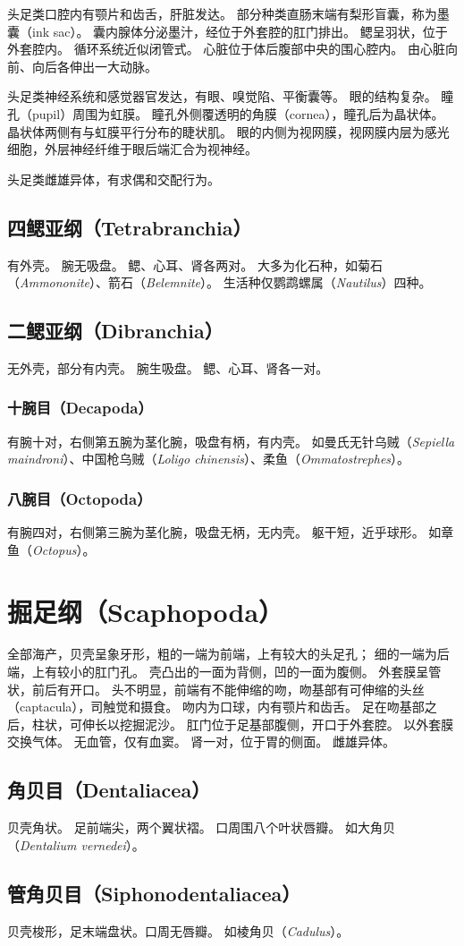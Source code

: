 \documentclass[11pt]{article}
\begin{document}
\newline

头足类口腔内有颚片和齿舌，肝脏发达。
部分种类直肠末端有梨形盲囊，称为墨囊（ink sac）。
囊内腺体分泌墨汁，经位于外套腔的肛门排出。
鳃呈羽状，位于外套腔内。
循环系统近似闭管式。
心脏位于体后腹部中央的围心腔内。
由心脏向前、向后各伸出一大动脉。

\newline

头足类神经系统和感觉器官发达，有眼、嗅觉陷、平衡囊等。
眼的结构复杂。
瞳孔（pupil）周围为虹膜。
瞳孔外侧覆透明的角膜（cornea），瞳孔后为晶状体。
晶状体两侧有与虹膜平行分布的睫状肌。
眼的内侧为视网膜，视网膜内层为感光细胞，外层神经纤维于眼后端汇合为视神经。

\newline

头足类雌雄异体，有求偶和交配行为。

\subsection{四鳃亚纲（Tetrabranchia）}
有外壳。
腕无吸盘。
鳃、心耳、肾各两对。
大多为化石种，如菊石（\textit{Ammononite}）、箭石（\textit{Belemnite}）。
生活种仅鹦鹉螺属（\textit{Nautilus}）四种。

\subsection{二鳃亚纲（Dibranchia）}
无外壳，部分有内壳。
腕生吸盘。
鳃、心耳、肾各一对。

\subsubsection{十腕目（Decapoda）}
有腕十对，右侧第五腕为茎化腕，吸盘有柄，有内壳。
如曼氏无针乌贼（\textit{Sepiella maindroni}）、中国枪乌贼（\textit{Loligo chinensis}）、柔鱼（\textit{Ommatostrephes}）。

\subsubsection{八腕目（Octopoda）}
有腕四对，右侧第三腕为茎化腕，吸盘无柄，无内壳。
躯干短，近乎球形。
如章鱼（\textit{Octopus}）。

\section{掘足纲（Scaphopoda）}
全部海产，贝壳呈象牙形，粗的一端为前端，上有较大的头足孔；
细的一端为后端，上有较小的肛门孔。
壳凸出的一面为背侧，凹的一面为腹侧。
外套膜呈管状，前后有开口。
头不明显，前端有不能伸缩的吻，吻基部有可伸缩的头丝（captacula），司触觉和摄食。
吻内为口球，内有颚片和齿舌。
足在吻基部之后，柱状，可伸长以挖掘泥沙。
肛门位于足基部腹侧，开口于外套腔。
以外套膜交换气体。
无血管，仅有血窦。
肾一对，位于胃的侧面。
雌雄异体。

\subsection{角贝目（Dentaliacea）}
贝壳角状。
足前端尖，两个翼状褶。
口周围八个叶状唇瓣。
如大角贝（\textit{Dentalium vernedei}）。

\subsection{管角贝目（Siphonodentaliacea）}
贝壳梭形，足末端盘状。口周无唇瓣。
如棱角贝（\textit{Cadulus}）。
  
\end{document}

